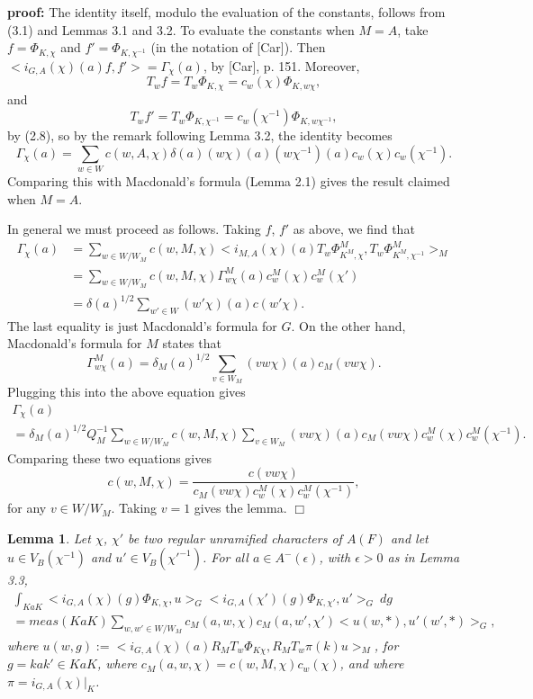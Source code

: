 \documentclass[12pt]{article}
\newtheorem{lemma}{Lemma}[section]
\newenvironment{pf}[1][proof:]{\par\medskip\noindent\textbf{#1} }{\par\medskip}
\begin{document}
\begin{pf}
The identity itself, modulo the evaluation of the constants, follows from (3.1) and Lemmas 3.1 and 3.2. To evaluate the constants when $M=A$, take $f=\Phi_{K,\chi}$ and $f'=\Phi_{K,\chi^{-1}}$ (in the notation of [Car]). Then $<i_{G,A}(\chi)(a)f,f'>=\Gamma_\chi(a)$, by [Car], p. 151. Moreover,
\[
T_wf=T_w\Phi_{K,\chi}=c_w(\chi)\Phi_{K,w\chi},
\]
and
\[
T_wf'=T_w\Phi_{K,\chi^{-1}}=c_w(\chi^{-1})\Phi_{K,w\chi^{-1}},
\]
by (2.8), so by the remark following Lemma 3.2, the identity becomes
\[
\Gamma_\chi(a)=\sum_{w\in W}c(w,A,\chi)\delta(a)(w\chi)(a)(w\chi^{-1})(a)c_w(\chi)c_w(\chi^{-1}).
\]
Comparing this with Macdonald's formula (Lemma 2.1) gives the result claimed when $M=A$.

In general we must proceed as follows. Taking $f$, $f'$ as above, we find that
\[
\begin{array}{rl}
\Gamma_\chi(a)&=\sum_{w\in W/W_M}c(w,M,\chi)<i_{M,A}(\chi)(a)T_w\Phi^M_{K^M,\chi},T_w\Phi^M_{K^M,\chi^{-1}}>_M\\
&=\sum_{w\in W/W_M}c(w,M,\chi)\Gamma^M_{w\chi}(a)c^M_w(\chi)c^M_w(\chi')\\
&=\delta(a)^{1/2}\sum_{w'\in W}(w'\chi)(a)c(w'\chi).
\end{array}
\]
The last equality is just Macdonald's formula for $G$. On the other hand, Macdonald's formula for $M$ states that
\[
\Gamma^M_{w\chi}(a)=\delta_M(a)^{1/2}\sum_{v\in W_M}(vw\chi)(a)c_M(vw\chi).
\]
Plugging this into the above equation gives
\[
\begin{array}{c}
\Gamma_\chi(a)\\
=\delta_M(a)^{1/2}Q_M^{-1}\sum_{w\in W/W_M}c(w,M,\chi)\sum_{v\in W_M}(vw\chi)(a)c_M(vw\chi)c^M_w(\chi)c^M_w(\chi^{-1}).
\end{array}
\]
Comparing these two equations gives
\[
c(w,M,\chi)=\frac{c(vw\chi)}{c_M(vw\chi)c^M_w(\chi)c^M_w(\chi^{-1})},
\]
for any $v\in W/W_M$. Taking $v=1$ gives the lemma. $\Box$
\end{pf}

\begin{lemma}
Let $\chi$, $\chi'$ be two regular unramified characters of $A(F)$ and let $u\in V_B(\chi^{-1})$ and $u'\in V_B(\chi'^{-1})$. For all $a\in A^-(\epsilon)$, with $\epsilon>0$ as in Lemma 3.3,
\[
\begin{array}{l}
\int_{KaK}<i_{G,A}(\chi)(g)\Phi_{K,\chi},u>_G<i_{G,A}(\chi')(g)\Phi_{K,\chi'},u'>_G\ dg\\
=meas(KaK)\sum_{w,w'\in W/W_M}c_M(a,w,\chi)c_M(a,w',\chi')<u(w,*),u'(w',*)>_G,
\end{array}
\]
where $u(w,g):=<i_{G,A}(\chi)(a)R_MT_w\Phi_{K\chi},R_MT_w\pi(k)u>_M$, for $g=kak'\in KaK$, where $c_M(a,w,\chi)=c(w,M,\chi)c_w(\chi)$, and where $\pi=i_{G,A}(\chi)|_K$.
\end{lemma}
\end{document}
